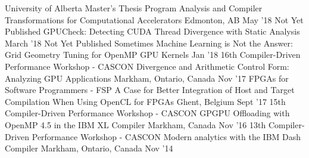 \begin{cventries}
\publication
  {University of Alberta Master's Thesis}
  {Program Analysis and Compiler Transformations for Computational Accelerators}
  {Edmonton, AB}
  {May '18}
\publication
  {Not Yet Published}
  {GPUCheck: Detecting CUDA Thread Divergence with Static Analysis}
  {}
  {March '18}
\publication
  {Not Yet Published}
  {Sometimes Machine Learning is Not the Answer: Grid Geometry Tuning for OpenMP GPU Kernels}
  {}
  {Jan '18}
\presentation
  {16th Compiler-Driven Performance Workshop - CASCON}
  {Divergence and Arithmetic Control Form: Analyzing GPU Applications}
  {Markham, Ontario, Canada}
  {Nov '17}
\publication
  {FPGAs for Software Programmers - FSP}
  {A Case for Better Integration of Host and Target Compilation When Using OpenCL for FPGAs}
  {Ghent, Belgium}
  {Sept '17}
\presentation
  {15th Compiler-Driven Performance Workshop - CASCON}
  {GPGPU Offloading with OpenMP 4.5 in the IBM XL Compiler}
  {Markham, Canada}
  {Nov '16}
\presentation
  {13th Compiler-Driven Performance Workshop - CASCON}
  {Modern analytics with the IBM Dash Compiler}
  {Markham, Ontario, Canada}
  {Nov '14}
\end{cventries}
